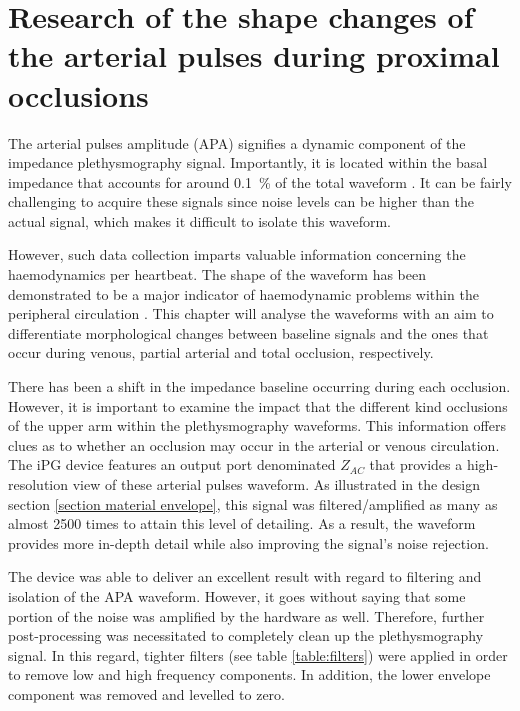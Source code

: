 
\chapter{Research of the shape changes of the arterial pulses during proximal occlusions}  %
\label{chapter apa}

\ifpdf
\graphicspath{{Chapter7/Figs/Raster/}{Chapter7/Figs/PDF/}{Chapter7/Figs/}}
\else
\graphicspath{{Chapter7/Figs/Vector/}{Chapter7/Figs/}}
\fi

The arterial pulses amplitude (APA) signifies a dynamic component of the impedance plethysmography signal. Importantly, it is located within the basal impedance that accounts for around \SI{0.1}{\percent} of the total waveform \cite{anderson1984impedance}. It can be fairly challenging to acquire these signals since noise levels can be higher than the actual signal, which makes it difficult to isolate this waveform. 

However, such data collection imparts valuable information concerning the haemodynamics per heartbeat. The shape of the waveform has been demonstrated to be a major indicator of haemodynamic problems within the peripheral circulation \cite{ montgomery2011segmental}. This chapter will analyse the waveforms with an aim to differentiate morphological changes between baseline signals and the ones that occur during venous, partial arterial and total occlusion, respectively.

There has been a shift in the impedance baseline occurring during each occlusion. However, it is important to examine the impact that the different kind occlusions of the upper arm within the plethysmography waveforms.  This information offers clues as to whether an occlusion may occur in the arterial or venous circulation.  The iPG device features an output port denominated $Z_{AC}$ that provides a high-resolution view of these arterial pulses waveform.  As illustrated in the design section \ref{section material envelope}, this signal was filtered/amplified as many as almost 2500 times to attain this level of detailing. As a result, the waveform provides more in-depth detail while also improving the signal's noise rejection.

The device was able to deliver an excellent result with regard to filtering and isolation of the APA waveform. However, it goes without saying that some portion of the noise was amplified by the hardware as well. Therefore, further post-processing was necessitated to completely clean up the plethysmography signal. In this regard, tighter filters (see table \ref{table:filters}) were applied in order to remove low and high frequency components. In addition, the lower envelope component was removed and levelled to zero.

